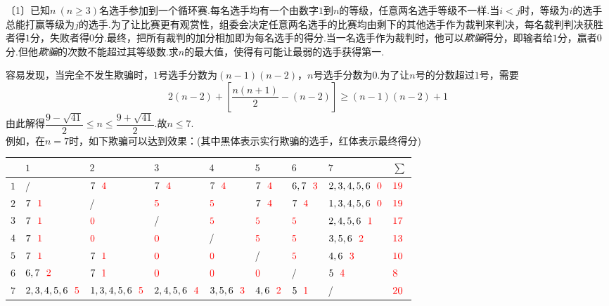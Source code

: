 \documentclass[cn,hazy,black,10pt,normal]{elegantnote}
\newcommand{\nd}[1]{〔#1〕}
\newcommand{\hlt}[1]{\color{red} #1 \color{black}}
\begin{document}
\begin{problem} %
	\nd{1}已知$n~(n \geq 3)$名选手参加到一个循环赛.每名选手均有一个由数字$1$到$n$的等级，任意两名选手等级不一样.当$i < j$时，等级为$i$的选手总能打赢等级为$j$的选手.为了让比赛更有观赏性，组委会决定任意两名选手的比赛均由剩下的其他选手作为裁判来判决，每名裁判判决获胜者得$1$分，失败者得$0$分.最终，把所有裁判的加分相加即为每名选手的得分.当一名选手作为裁判时，他可以\textit{欺骗}得分，即输者给$1$分，嬴者$0$分.但他\textit{欺骗}的次数不能超过其等级数.求$n$的最大值，使得有可能让最弱的选手获得第一.
\end{problem}
\begin{solution}
	容易发现，当完全不发生欺骗时，$1$号选手分数为$(n-1)(n-2)$，$n$号选手分数为$0$.为了让$n$号的分数超过$1$号，需要$$2(n-2)+\left[ \frac{n(n+1)}{2} - (n-2) \right] \geq (n-1)(n-2)+1$$
	由此解得$\dfrac{9-\sqrt{41}}{2} \leq n \leq \dfrac{9+\sqrt{41}}{2}$.故$n \leq 7$. \\
	例如，在$n=7$时，如下欺骗可以达到效果：(其中黑体表示实行欺骗的选手，红体表示最终得分)
	
	\begin{table}[h]
	\centering
	\renewcommand\arraystretch{1.3}
\begin{tabular}{|l|l|l|l|l|l|l|l|l|}
\hline
    & $1$         & $2$         & $3$       & $4$     & $5$   & $6$   & $7$         & $\sum$ \\ \hline
$1$ & /           & $7~~\hlt{4}$         & $7~~\hlt{4}$       & $7~~\hlt{4}$     & $7~~\hlt{4}$   & $6,7~~\hlt{3}$ & $2,3,4,5,6~~\hlt{0}$ & $\hlt{19}$   \\ \hline
$2$ & $7~~\hlt{1}$         & /           & $\hlt{5}$          & $\hlt{5}$        & $7~~\hlt{4}$   & $7~~\hlt{4}$   & $1,3,4,5,6~~\hlt{0}$ & $\hlt{19}$   \\ \hline
$3$ & $7~~\hlt{1}$         & $\hlt{0}$            & /         & $\hlt{5}$        & $\hlt{5}$      & $\hlt{5}$      & $2,4,5,6~~\hlt{1}$   & $\hlt{17}$   \\ \hline
$4$ & $7~~\hlt{1}$         & $\hlt{0}$            & $\hlt{0}$          & /       & $\hlt{5}$      & $\hlt{5}$      & $3,5,6~~\hlt{2}$     & $\hlt{13}$   \\ \hline
$5$ & $7~~\hlt{1}$         & $7~~\hlt{1}$         & $\hlt{0}$          & $\hlt{0}$        & /     & $\hlt{5}$      & $4,6~~\hlt{3}$       & $\hlt{10}$   \\ \hline
$6$ & $6,7~~\hlt{2}$       & $7~~\hlt{1}$         & $\hlt{0}$          & $\hlt{0}$        & $\hlt{0}$      & /     & $5~~\hlt{4}$         & $\hlt{8}$    \\ \hline
$7$ & $2,3,4,5,6~~\hlt{5}$ & $1,3,4,5,6~~\hlt{5}$ & $2,4,5,6~~\hlt{4}$ & $3,5,6~~\hlt{3}$ & $4,6~~\hlt{2}$ & $5~~\hlt{1}$   & /           & $\hlt{20}$   \\ \hline
\end{tabular}
\end{table}
\end{solution}
\end{document}
